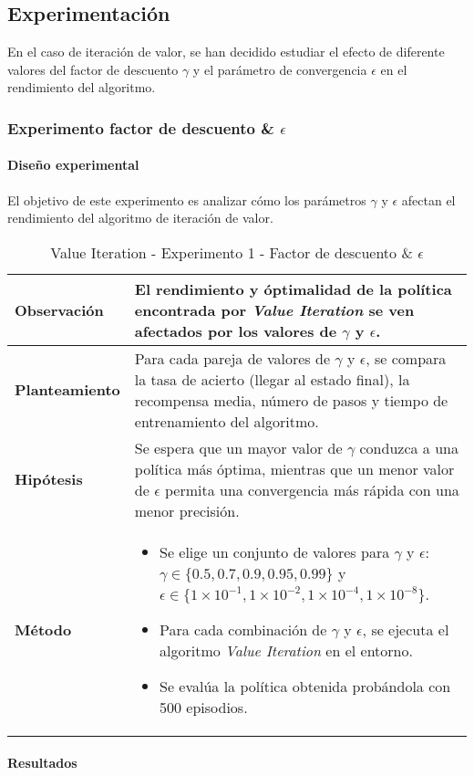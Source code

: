 \subsection{Experimentación}

En el caso de iteración de valor, se han decidido estudiar el efecto de diferente valores del factor de descuento $\gamma$ y el parámetro de convergencia $\epsilon$ en el rendimiento del algoritmo. 

\subsubsection{Experimento factor de descuento \& \(\epsilon\)} 

\paragraph{Diseño experimental}
El objetivo de este experimento es analizar cómo los parámetros \(\gamma\) y \(\epsilon\) afectan el rendimiento del algoritmo de iteración de valor.

\begin{table}[H]
    \centering
    \begin{tabularx}{\textwidth}{|p{4cm}|X|} %
        \hline %
        \textbf{Observación} & El rendimiento y óptimalidad de la política encontrada por \textit{Value Iteration} se ven afectados por los valores de $\gamma$ y $\epsilon$.
        \\ \hline
        \textbf{Planteamiento} & Para cada pareja de valores de $\gamma$ y $\epsilon$, se compara la tasa de acierto (llegar al estado final), la recompensa media, número de pasos y tiempo de entrenamiento del algoritmo.
        \\ \hline
        \textbf{Hipótesis} & Se espera que un mayor valor de $\gamma$ conduzca a una política más óptima, mientras que un menor valor de $\epsilon$ permita una convergencia más rápida con una menor precisión.
        \\ \hline
        \textbf{Método} & 
        \begin{itemize}
            \item Se elige un conjunto de valores para $\gamma$ y $\epsilon$: \(\gamma \in \{0.5, 0.7, 0.9, 0.95, 0.99\}\) y \(\epsilon \in \{1\times 10^{-1}, 1\times 10^{-2}, 1\times 10^{-4}, 1\times 10^{-8}\}\).
            \item Para cada combinación de \(\gamma\) y \(\epsilon\), se ejecuta el algoritmo \textit{Value Iteration} en el entorno.
            \item Se evalúa la política obtenida probándola con 500 episodios.
        \end{itemize}
        \\ \hline
    \end{tabularx}
    \caption{Value Iteration - Experimento 1 - Factor de descuento \& $\epsilon$}
    \label{tab:diseñoValueIterationExp1}
\end{table}

\paragraph{Resultados}